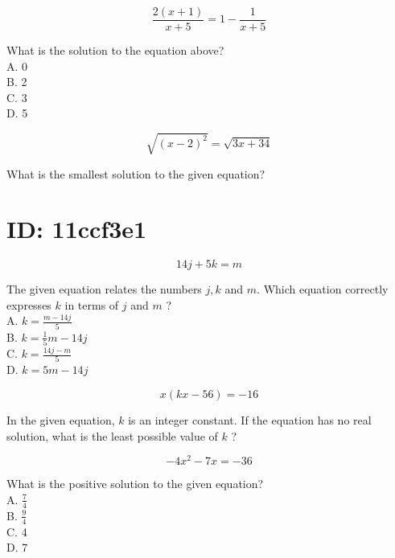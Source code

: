 $$
\frac{2(x+1)}{x+5}=1-\frac{1}{x+5}
$$

What is the solution to the equation above?\\
A. 0\\
B. 2\\
C. 3\\
D. 5

$$
\sqrt{(x-2)^{2}}=\sqrt{3 x+34}
$$

What is the smallest solution to the given equation?

















































\section*{ID: 11ccf3e1}
$$
14 j+5 k=m
$$

The given equation relates the numbers $j, k$ and $m$. Which equation correctly expresses $k$ in terms of $j$ and $m$ ?\\
A. $k=\frac{m-14 j}{5}$\\
B. $k=\frac{1}{5} m-14 j$\\
C. $k=\frac{14 j-m}{5}$\\
D. $k=5 m-14 j$

$$
x(k x-56)=-16
$$

In the given equation, $k$ is an integer constant. If the equation has no real solution, what is the least possible value of $k$ ?

$$
-4 x^{2}-7 x=-36
$$

What is the positive solution to the given equation?\\
A. $\frac{7}{4}$\\
B. $\frac{9}{4}$\\
C. 4\\
D. 7

